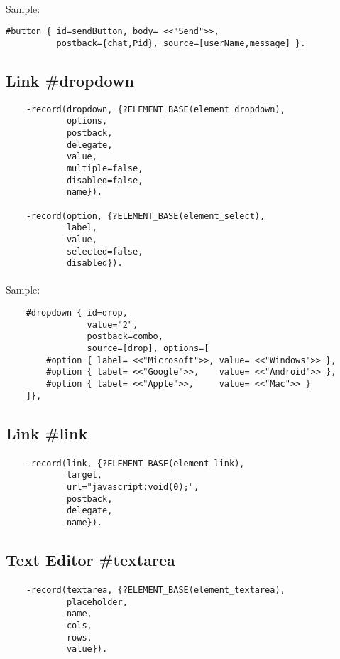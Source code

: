 \paragraph{}
Sample:

\begin{lstlisting}
#button { id=sendButton, body= <<"Send">>,
          postback={chat,Pid}, source=[userName,message] }.
\end{lstlisting}

\subsection{Link {\bf \#dropdown}}

\begin{lstlisting}
    -record(dropdown, {?ELEMENT_BASE(element_dropdown),
            options,
            postback,
            delegate,
            value,
            multiple=false,
            disabled=false,
            name}).

    -record(option, {?ELEMENT_BASE(element_select),
            label,
            value,
            selected=false,
            disabled}).
\end{lstlisting}

\paragraph{}
Sample:

\begin{lstlisting}
    #dropdown { id=drop,
                value="2",
                postback=combo,
                source=[drop], options=[
        #option { label= <<"Microsoft">>, value= <<"Windows">> },
        #option { label= <<"Google">>,    value= <<"Android">> },
        #option { label= <<"Apple">>,     value= <<"Mac">> }
    ]},
\end{lstlisting}

\newpage
\subsection{Link {\bf \#link}}

\paragraph{}
\begin{lstlisting}
    -record(link, {?ELEMENT_BASE(element_link),
            target,
            url="javascript:void(0);",
            postback,
            delegate,
            name}).
\end{lstlisting}
\vspace{1\baselineskip}

\subsection{Text Editor {\bf \#textarea}}

\paragraph{}
\vspace{1\baselineskip}
\begin{lstlisting}
    -record(textarea, {?ELEMENT_BASE(element_textarea),
            placeholder,
            name,
            cols,
            rows,
            value}).
\end{lstlisting}
\vspace{1\baselineskip}
